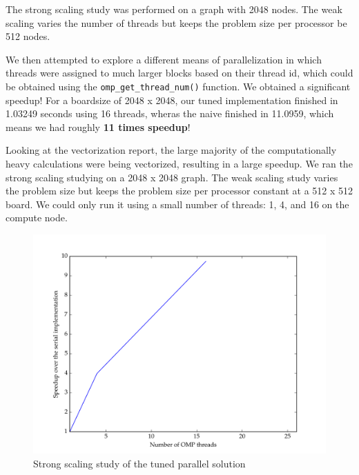 \documentclass[11pt]{article}
\begin{document}
The strong scaling study was performed on a graph with 2048 nodes. The weak scaling varies the number of threads but keeps the problem size per processor be 512 nodes. 

We then attempted to explore a different means of parallelization in which threads were assigned to much larger blocks based on their thread id, which could be obtained using the \texttt{omp\_get\_thread\_num()} function. We obtained a significant speedup! For a boardsize of 2048 x 2048, our tuned implementation finished in 1.03249 seconds using 16 threads, wheras the naive finished in 11.0959, which means we had roughly \textbf{11 times speedup}! 

Looking at the vectorization report, the large majority of the computationally heavy calculations were being vectorized, resulting in a large speedup. We ran the strong scaling studying on a 2048 x 2048 graph. The weak scaling study varies the problem size but keeps the problem size per processor constant at a 512 x 512 board. We could only run it using a small number of threads: 1, 4, and 16 on the compute node.

\begin{figure}[H]
\centering
\includegraphics[scale=0.5]{./scaling_studies/strong_scaling_eric.png}
\caption{Strong scaling study of the tuned parallel solution}
\label{fig:ss_eric}
\end{figure}
\end{document}
